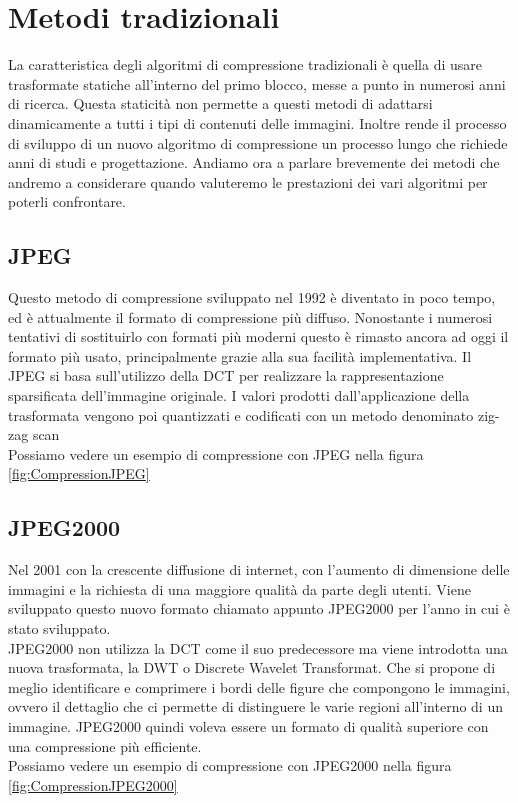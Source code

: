 \chapter{Metodi tradizionali}
La caratteristica degli algoritmi di compressione tradizionali è quella di usare trasformate statiche all’interno del primo blocco, messe a punto in numerosi anni di ricerca. Questa staticità non permette a questi metodi di adattarsi dinamicamente a tutti i tipi di contenuti delle immagini. Inoltre rende il processo di sviluppo di un nuovo algoritmo di compressione un processo lungo che richiede anni di studi e progettazione. \cite{ cheng2018deep}
Andiamo ora a parlare brevemente dei metodi che andremo a considerare quando valuteremo le prestazioni dei vari algoritmi per poterli confrontare.

\section{JPEG}
Questo metodo di compressione sviluppato nel 1992 è diventato in poco tempo, ed è attualmente il formato di compressione più diffuso. Nonostante i numerosi tentativi di sostituirlo con formati più moderni questo è rimasto ancora ad oggi il formato più usato, principalmente grazie alla sua facilità implementativa. Il JPEG si basa sull’utilizzo della DCT per realizzare la rappresentazione sparsificata dell’immagine originale. I valori prodotti dall'applicazione della trasformata vengono poi quantizzati e codificati con un metodo denominato zig-zag scan \cite{ 125072} \\
Possiamo vedere un esempio di compressione con JPEG nella figura \ref*{fig:CompressionJPEG}

\section{JPEG2000}
Nel 2001 con la crescente diffusione di internet, con l’aumento di dimensione delle immagini e la richiesta di una maggiore qualità da parte degli utenti. Viene sviluppato questo nuovo formato chiamato appunto JPEG2000 per l’anno in cui è stato sviluppato.\\
JPEG2000 non utilizza la DCT come il suo predecessore ma viene introdotta una nuova trasformata, la DWT o Discrete Wavelet Transformat. Che si propone di meglio identificare e comprimere i bordi delle figure che compongono le immagini, ovvero il dettaglio che ci permette di distinguere le varie regioni all'interno di un immagine.
JPEG2000 quindi voleva essere un formato di qualità superiore con una compressione più efficiente.\cite{952804}\\
Possiamo vedere un esempio di compressione con JPEG2000 nella figura \ref*{fig:CompressionJPEG2000}

